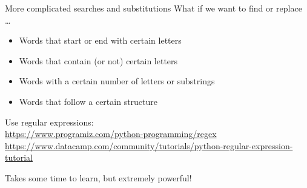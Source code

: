 \documentclass[aspectratio=169,usenames,dvipsnames]{beamer}
\begin{document}
\begin{frame}{More complicated searches and substitutions}
What if we want to find or replace \dots
\begin{itemize}
    \item Words that start or end with certain letters
    \item Words that contain (or not) certain letters
    \item Words with a certain number of letters or substrings
    \item Words that follow a certain structure
\end{itemize}

Use regular expressions:\\
\url{https://www.programiz.com/python-programming/regex} \\
\url{https://www.datacamp.com/community/tutorials/python-regular-expression-tutorial}

Takes some time to learn, but extremely powerful!
\end{frame}
\end{document}
